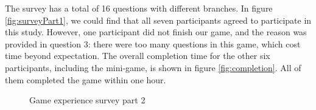 \documentclass[msc,deptreport,ai]{infthesis}      %
\begin{document}
The survey has a total of 16 questions with different branches. In figure \ref{fig:surveyPart1}, we could find that all seven participants agreed to participate in this study. However, one participant did not finish our game, and the reason was provided in question 3: there were too many questions in this game, which cost time beyond expectation. The overall completion time for the other six participants, including the mini-game, is shown in figure \ref{fig:completion}. All of them completed the game within one hour.

\begin{figure}[htbp]
\center
{}\hspace{-1pt}%
\hspace{-1pt}%
\caption{Game experience survey part 2}
\label{fig:surveyPart2}
\end{figure}
\end{document}

